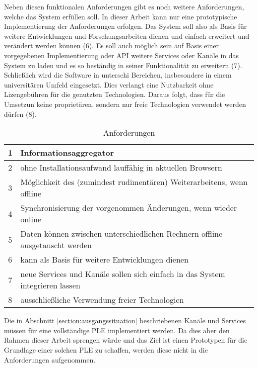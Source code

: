 Neben diesen funktionalen Anforderungen gibt es noch weitere Anforderungen, welche das System erfüllen soll. In dieser Arbeit kann nur eine prototypische Implementierung der Anforderungen erfolgen. Das System soll also als Basis für weitere Entwicklungen und Forschungsarbeiten dienen und einfach erweitert und verändert werden können (6). Es soll auch möglich sein auf Basis einer vorgegebenen Implementierung oder API weitere Services oder Kanäle in das System zu laden und es so beständig in seiner Funktionalität zu erweitern (7). Schließlich wird die Software in unterschi Bereichen, insbesondere in einem universitären Umfeld eingesetzt. Dies verlangt eine Nutzbarkeit ohne Lizengebühren für die genutzten Technologien. Daraus folgt, dass für die Umsetzun keine proprietären, sondern nur freie Technologien verwendet werden dürfen (8). 

\begin{table}[h]
\caption{Anforderungen}
\begin{tabular}{c || l}
1 & Informationsaggregator \\
\hline
2 & ohne Installationsaufwand lauffähig in aktuellen Browsern \\
\hline
3 & Möglichkeit des (zumindest rudimentären) Weiterarbeitens, wenn offline \\
\hline
4 & Synchronisierung der vorgenommen Änderungen, wenn wieder online \\
\hline
5 & Daten können zwischen unterschiedlichen Rechnern offline ausgetauscht werden \\
\hline
6 & kann als Basis für weitere Entwicklungen dienen\\
\hline
7 & neue Services und Kanäle sollen sich einfach in das System integrieren lassen  \\
\hline
8 & ausschließliche Verwendung freier Technologien \\
\hline
\end{tabular}
\label{table:anforderungen}
\end{table}

Die in Abschnitt \ref{section:ausgangssituation} beschriebenen Kanäle und Services müssen für eine vollständige PLE implementiert werden. Da dies aber den Rahmen dieser Arbeit sprengen würde und das Ziel ist einen Prototypen für die Grundlage einer solchen PLE zu schaffen, werden diese nicht in die Anforderungen aufgenommen.